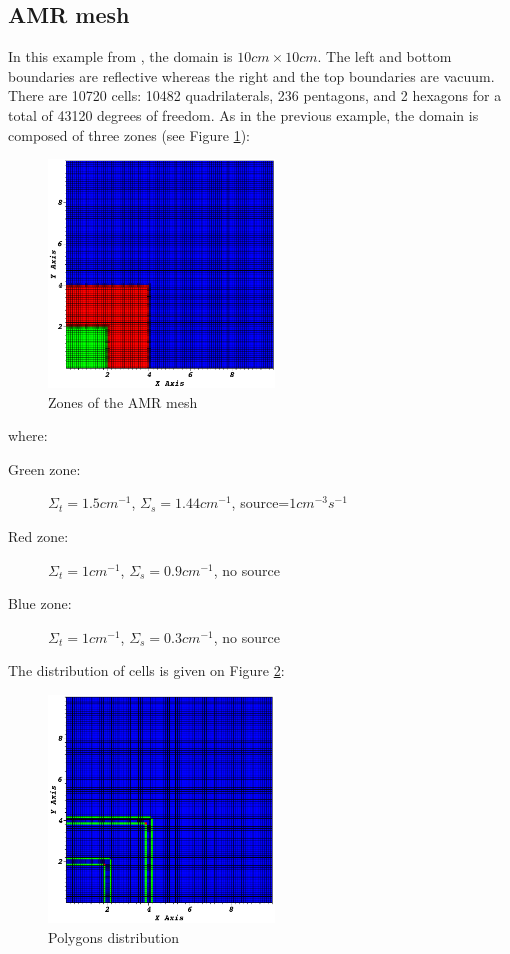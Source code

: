 \subsection{AMR mesh}
In this example from \cite{mip}, the domain is $10cm\times 10cm$. The left and bottom
boundaries are reflective whereas the right and the top boundaries are vacuum. 
There are 10720 cells: 10482 quadrilaterals, 236 pentagons,
and 2 hexagons for a total of 43120 degrees of freedom. 
As in the previous example, the domain is composed of three zones (see Figure
\ref{fig_zone_amr}):
\begin{figure}[H]
  \centering
  \includegraphics[width=6cm]{./Dsa/zone_amr}
  \caption{Zones of the AMR mesh}
  \label{fig_zone_amr}
\end{figure}
where:
\begin{description}
  \item[Green zone:] $\Sigma_t=1.5cm^{-1}$, $\Sigma_s=1.44cm^{-1}$,
    source=$1cm^{-3}s^{-1}$
  \item[Red zone:] $\Sigma_t=1cm^{-1}$, $\Sigma_s=0.9cm^{-1}$, no source
  \item[Blue zone:] $\Sigma_t=1cm^{-1}$, $\Sigma_s=0.3cm^{-1}$, no source
\end{description}
The distribution of cells is given on Figure \ref{fig_distr}:
\begin{figure}[H]
  \centering
  \includegraphics[width=6cm]{./Dsa/polygon_amr}
  \caption{Polygons distribution}
  \label{fig_distr}
\end{figure}
